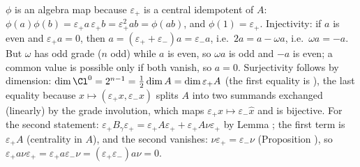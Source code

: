$\phi$ is an algebra map because $\varepsilon_+$ is a central idempotent of $A$: $\phi(a)\phi(b) = \varepsilon_+ a\, \varepsilon_+ b = \varepsilon_+^2 ab = \phi(ab)$, and $\phi(1) = \varepsilon_+$. Injectivity: if $a$ is even and $\varepsilon_+ a = 0$, then $a = (\varepsilon_+ + \varepsilon_-)a = \varepsilon_- a$, i.e.\ $2a = a - \omega a$, i.e.\ $\omega a = -a$. But $\omega$ has odd grade ($n$ odd) while $a$ is even, so $\omega a$ is odd and $-a$ is even; a common value is possible only if both vanish, so $a = 0$. Surjectivity follows by dimension: $\dim \Cl^0 = 2^{n-1} = \tfrac12 \dim A = \dim \varepsilon_+ A$ (the first equality is ), the last equality because $x \mapsto (\varepsilon_+ x, \varepsilon_- x)$ splits $A$ into two summands exchanged (linearly) by the grade involution, which maps $\varepsilon_+ x \mapsto \varepsilon_- \hat{x}$ and is bijective. For the second statement: $\varepsilon_+ B_\gamma \varepsilon_+ = \varepsilon_+ A \varepsilon_+ + \varepsilon_+ A \nu \varepsilon_+$ by Lemma ; the first term is $\varepsilon_+ A$ (centrality in $A$), and the second vanishes: $\nu \varepsilon_+ = \varepsilon_- \nu$ (Proposition ), so $\varepsilon_+ a \nu \varepsilon_+ = \varepsilon_+ a \varepsilon_- \nu = (\varepsilon_+ \varepsilon_-) a \nu = 0$.
